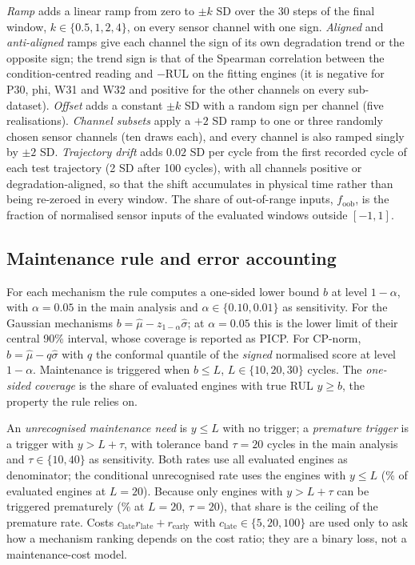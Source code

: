 \documentclass[11pt,a4paper]{article}
\begin{document}
\emph{Ramp} adds a linear ramp from zero to $\pm k$ SD over the 30 steps of the final window, $k\in\{0.5,1,2,4\}$, on every sensor channel with one sign. \emph{Aligned} and \emph{anti-aligned} ramps give each channel the sign of its own degradation trend or the opposite sign; the trend sign is that of the Spearman correlation between the condition-centred reading and $-$RUL on the fitting engines (it is negative for P30, phi, W31 and W32 and positive for the other channels on every sub-dataset). \emph{Offset} adds a constant $\pm k$ SD with a random sign per channel (five realisations). \emph{Channel subsets} apply a $+2$ SD ramp to one or three randomly chosen sensor channels (ten draws each), and every channel is also ramped singly by $\pm2$ SD. \emph{Trajectory drift} adds $0.02$ SD per cycle from the first recorded cycle of each test trajectory (2 SD after 100 cycles), with all channels positive or degradation-aligned, so that the shift accumulates in physical time rather than being re-zeroed in every window. The share of out-of-range inputs, $f_{\mathrm{oob}}$, is the fraction of normalised sensor inputs of the evaluated windows outside $[-1,1]$.

\subsection{Maintenance rule and error accounting}
For each mechanism the rule computes a one-sided lower bound $b$ at level $1-\alpha$, with $\alpha=0.05$ in the main analysis and $\alpha\in\{0.10,0.01\}$ as sensitivity. For the Gaussian mechanisms $b=\hat\mu-z_{1-\alpha}\hat\sigma$; at $\alpha=0.05$ this is the lower limit of their central 90\% interval, whose coverage is reported as PICP. For CP-norm, $b=\hat\mu-q\hat\sigma$ with $q$ the conformal quantile of the \emph{signed} normalised score at level $1-\alpha$. Maintenance is triggered when $b\le L$, $L\in\{10,20,30\}$ cycles. The \emph{one-sided coverage} is the share of evaluated engines with true RUL $y\ge b$, the property the rule relies on.

An \emph{unrecognised maintenance need} is $y\le L$ with no trigger; a \emph{premature trigger} is a trigger with $y>L+\tau$, with tolerance band $\tau=20$ cycles in the main analysis and $\tau\in\{10,40\}$ as sensitivity. Both rates use all evaluated engines as denominator; the conditional unrecognised rate uses the engines with $y\le L$ (\RVAtRisk\% of evaluated engines at $L=20$). Because only engines with $y>L+\tau$ can be triggered prematurely (\RVFar\% at $L=20$, $\tau=20$), that share is the ceiling of the premature rate. Costs $c_{\mathrm{late}}r_{\mathrm{late}}+r_{\mathrm{early}}$ with $c_{\mathrm{late}}\in\{5,20,100\}$ are used only to ask how a mechanism ranking depends on the cost ratio; they are a binary loss, not a maintenance-cost model.
\end{document}
